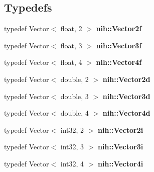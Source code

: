 \subsection*{\-Typedefs}
\begin{DoxyCompactItemize}
\item 
\hypertarget{group__vectors_gabbcc1381565199b14a44e3afc944ca17}{
typedef \-Vector$<$ float, 2 $>$ {\bfseries nih\-::\-Vector2f}}
\label{group__vectors_gabbcc1381565199b14a44e3afc944ca17}

\item 
\hypertarget{group__vectors_ga0647b3ed4341a247c1e76e5b53093b5f}{
typedef \-Vector$<$ float, 3 $>$ {\bfseries nih\-::\-Vector3f}}
\label{group__vectors_ga0647b3ed4341a247c1e76e5b53093b5f}

\item 
\hypertarget{group__vectors_ga7995ea0516a644636ad92f4b7bc04eaa}{
typedef \-Vector$<$ float, 4 $>$ {\bfseries nih\-::\-Vector4f}}
\label{group__vectors_ga7995ea0516a644636ad92f4b7bc04eaa}

\item 
\hypertarget{group__vectors_ga4fc7e6a2c6996a3e747fbedbb67e1863}{
typedef \-Vector$<$ double, 2 $>$ {\bfseries nih\-::\-Vector2d}}
\label{group__vectors_ga4fc7e6a2c6996a3e747fbedbb67e1863}

\item 
\hypertarget{group__vectors_ga7c1aad15ff15343ac537134d394ef70c}{
typedef \-Vector$<$ double, 3 $>$ {\bfseries nih\-::\-Vector3d}}
\label{group__vectors_ga7c1aad15ff15343ac537134d394ef70c}

\item 
\hypertarget{group__vectors_gaf88cc8ac3ee4154632f9ab07406e2921}{
typedef \-Vector$<$ double, 4 $>$ {\bfseries nih\-::\-Vector4d}}
\label{group__vectors_gaf88cc8ac3ee4154632f9ab07406e2921}

\item 
\hypertarget{group__vectors_ga5ce7ab86d5f4892fa9c675180f5859d7}{
typedef \-Vector$<$ int32, 2 $>$ {\bfseries nih\-::\-Vector2i}}
\label{group__vectors_ga5ce7ab86d5f4892fa9c675180f5859d7}

\item 
\hypertarget{group__vectors_gad0b51f8145e2a7f3065115fecdfd8609}{
typedef \-Vector$<$ int32, 3 $>$ {\bfseries nih\-::\-Vector3i}}
\label{group__vectors_gad0b51f8145e2a7f3065115fecdfd8609}

\item 
\hypertarget{group__vectors_ga2d7d8141688508f19e965e06e48636de}{
typedef \-Vector$<$ int32, 4 $>$ {\bfseries nih\-::\-Vector4i}}
\label{group__vectors_ga2d7d8141688508f19e965e06e48636de}

\end{DoxyCompactItemize}
